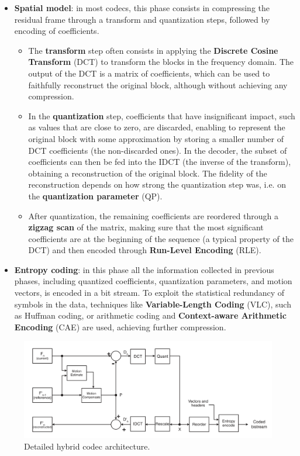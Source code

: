 \begin{itemize}
    \item \textbf{Spatial model}: in most codecs, this phase consists in compressing the residual frame through a transform and quantization steps, followed by encoding of coefficients.
        \begin{itemize}
            \item The \textbf{transform} step often consists in applying the \textbf{Discrete Cosine Transform} (DCT) to transform the blocks in the frequency domain. The output of the DCT is a matrix of coefficients, which can be used to faithfully reconstruct the original block, although without achieving any compression.
            \item In the \textbf{quantization} step, coefficients that have insignificant impact, such as values that are close to zero, are discarded, enabling to represent the original block with some approximation by storing a smaller number of DCT coefficients (the non-discarded ones). In the decoder, the subset of coefficients can then be fed into the IDCT (the inverse of the transform), obtaining a reconstruction of the original block. The fidelity of the reconstruction depends on how strong the quantization step was, i.e. on the \textbf{quantization parameter} (QP).
            \item After quantization, the remaining coefficients are reordered through a \textbf{zigzag scan} of the matrix, making sure that the most significant coefficients are at the beginning of the sequence (a typical property of the DCT) and then encoded through \textbf{Run-Level Encoding} (RLE).
        \end{itemize}
     
    \item \textbf{Entropy coding}: in this phase all the information collected in previous phases, including quantized coefficients, quantization parameters, and motion vectors, is encoded in a bit stream. To exploit the statistical redundancy of symbols in the data, techniques like \textbf{Variable-Length Coding} (VLC), such as Huffman coding, or arithmetic coding and \textbf{Context-aware Arithmetic Encoding} (CAE) are used, achieving further compression.
\end{itemize}

\begin{figure}[hb]
	\centering
	
	\includegraphics[width=\textwidth]{res/hybrid_codec_detailed.png}
	
	\caption{Detailed hybrid codec architecture.\cite{h264}}
	\label{fig:codec_highlevel}
\end{figure}

